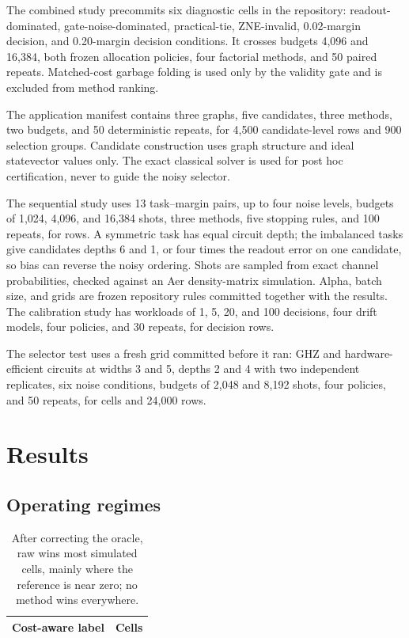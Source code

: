 \documentclass[10pt,twocolumn]{article}
\begin{document}
The combined study precommits six diagnostic cells in the repository: readout-dominated,
gate-noise-dominated, practical-tie, ZNE-invalid, 0.02-margin decision, and
0.20-margin decision conditions. It crosses budgets 4,096 and 16,384, both frozen
allocation policies, four factorial methods, and 50 paired repeats. Matched-cost
garbage folding is used only by the validity gate and is excluded from method
ranking.

The application manifest contains three graphs, five candidates, three methods, two
budgets, and 50 deterministic repeats, for 4,500 candidate-level rows and 900
selection groups. Candidate construction uses graph structure and ideal statevector
values only. The exact classical solver is used for post hoc certification, never to
guide the noisy selector.

The sequential study uses 13 task--margin pairs, up to four noise levels, budgets of
1,024, 4,096, and 16,384 shots, three methods, five stopping rules, and 100 repeats, for
\SequentialRows{} rows. A symmetric task has equal circuit depth; the imbalanced tasks
give candidates depths 6 and 1, or four times the readout error on one candidate, so
bias can reverse the noisy ordering. Shots are sampled from exact channel probabilities,
checked against an Aer density-matrix simulation. Alpha, batch size, and grids are
frozen repository rules committed together with the results. The calibration
study has workloads of 1, 5, 20, and 100 decisions, four drift models, four policies, and
30 repeats, for \LifetimeRows{} decision rows.

The selector test uses a fresh grid committed before it ran: GHZ and hardware-efficient circuits
at widths 3 and 5, depths 2 and 4 with two independent replicates, six noise conditions, budgets
of 2,048 and 8,192 shots, four policies, and 50 repeats, for \VTwoCells{} cells and 24,000 rows.

\section{Results}
\subsection{Operating regimes}
\begin{table}[t]
\centering
\caption{After correcting the oracle, raw wins most simulated cells, mainly where the
reference is near zero; no method wins everywhere.}
\label{tab:regimes}
\begin{tabular}{lr}
\toprule
Cost-aware label & Cells\\
\midrule

\end{tabular}
\end{table}
\end{document}
